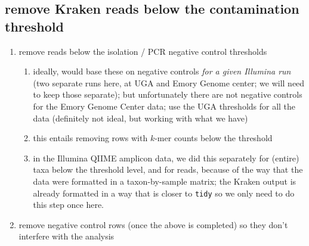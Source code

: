 \documentclass[
]{article}
\providecommand{\tightlist}{%
  \setlength{\itemsep}{0pt}\setlength{\parskip}{0pt}}
\begin{document}
\hypertarget{remove-kraken-reads-below-the-contamination-threshold}{%
\subsection{remove Kraken reads below the contamination
threshold}\label{remove-kraken-reads-below-the-contamination-threshold}}

\begin{enumerate}
\def\labelenumi{\arabic{enumi}.}
\tightlist
\item
  remove reads below the isolation / PCR negative control thresholds

  \begin{enumerate}
  \def\labelenumii{\alph{enumii})}
  \tightlist
  \item
    ideally, would base these on negative controls \emph{for a given
    Illumina run} (two separate runs here, at UGA and Emory Genome
    center; we will need to keep those separate); but unfortunately
    there are not negative controls for the Emory Genome Center data;
    use the UGA thresholds for all the data (definitely not ideal, but
    working with what we have)
  \item
    this entails removing rows with \(k\)-mer counts below the threshold
  \item
    in the Illumina QIIME amplicon data, we did this separately for
    (entire) taxa below the threshold level, and for reads, because of
    the way that the data were formatted in a taxon-by-sample matrix;
    the Kraken output is already formatted in a way that is closer to
    \texttt{tidy} so we only need to do this step once here.
  \end{enumerate}
\item
  remove negative control rows (once the above is completed) so they
  don't interfere with the analysis
\end{enumerate}
\end{document}
